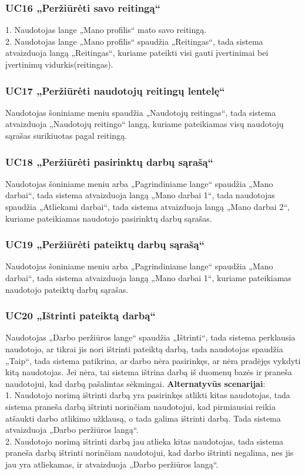 \documentclass{VUMIFPSbakalaurinis}
\begin{document}
\subsubsection{UC16 „Peržiūrėti savo reitingą“}
1. Naudotojas lange „Mano profilis“ mato savo reitingą. \\
2. Naudotojas lange „Mano profilis“ spaudžia „Reitingas“, tada sistema atvaizduoja langą „Reitingas“, kuriame pateikti visi gauti įvertinimai bei įvertinimų vidurkis(reitingas).
\subsubsection{UC17 „Peržiūrėti naudotojų reitingų lentelę“}
Naudotojas šoniniame meniu spaudžia „Naudotojų reitingas“, tada sistema atvaizduoja „Naudotojų reitingo“ langą, kuriame pateikiamas visų naudotojų sąrašas surikiuotas pagal reitingą.
\subsubsection{UC18 „Peržiūrėti pasirinktų darbų sąrašą“}
Naudotojas šoniniame meniu arba „Pagrindiniame lange“ spaudžia „Mano darbai“, tada sistema atvaizduoja langą „Mano darbai 1“, tada naudotojas spaudžia „Atliekami darbai“, tada sistema atvaizduoja langą „Mano darbai 2“, kuriame pateikiamas naudotojo pasirinktų darbų sąrašas.
\subsubsection{UC19 „Peržiūrėti pateiktų darbų sąrašą“}
Naudotojas šoniniame meniu arba „Pagrindiniame lange“ spaudžia „Mano darbai“, tada sistema atvaizduoja langą „Mano darbai 1“, kuriame pateikiamas naudotojo pateiktų darbų sąrašas.
\subsubsection{UC20 „Ištrinti pateiktą darbą“}
Naudotojas „Darbo peržiūros lange“ spaudžia „Ištrinti“, tada sistema perklausia naudotojo, ar tikrai jis nori ištrinti pateiktą darbą, tada naudotojas spaudžia „Taip“, tada sistema patikrina, ar darbo nėra pasirinkęs, ar nėra pradėjęs vykdyti kitą naudotojas. Jei nėra, tai sistema ištrina darbą iš duomenų bazės ir praneša naudotojui, kad darbą pašalintas sėkmingai.
\textbf{Alternatyvūs scenarijai}: \\
1. Naudotojo norimą ištrinti darbą yra pasirinkęs atlikti kitas naudotojas, tada sistema praneša darbą ištrinti norinčiam naudotojui, kad pirmiausiai reikia atšaukti darbo atlikimo užklausą, o tada galima ištrinti darbą. Tada sistema atvaizduoja „Darbo peržiūros langą“.\\ 
2. Naudotojo norimą ištrinti darbą jau atlieka kitas naudotojas, tada sistema praneša darbą ištrinti norinčiam naudotojui, kad darbo ištrinti negalima, nes jis jau yra atliekamas, ir atvaizduoja „Darbo peržiūros langą“.
\end{document}
